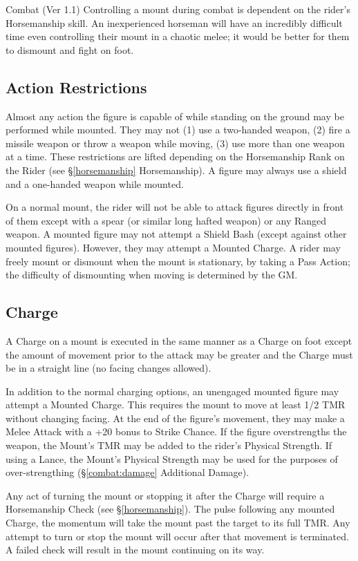 \begin{Chapter}{Combat (Ver 1.1)}
Controlling a mount during combat is dependent on the rider’s
Horsemanship skill.  An inexperienced horseman will have an
incredibly difficult time even controlling their mount in a chaotic
melee; it would be better for them to dismount and fight on foot.

\subsection{Action Restrictions}

Almost any action the figure is capable of while standing on the
ground may be performed while mounted.  They may not (1) use a
two-handed weapon, (2) fire a missile weapon or throw a weapon while
moving, (3) use more than one weapon at a time.  These restrictions
are lifted depending on the Horsemanship Rank on the Rider (see
\S\ref{horsemanship} Horsemanship).  A figure may always use a shield
and a one-handed weapon while mounted.

On a normal mount, the rider will not be able to attack figures
directly in front of them except with a spear (or similar long hafted
weapon) or any Ranged weapon.  A mounted figure may not attempt a
Shield Bash (except against other mounted figures).  However, they may
attempt a Mounted Charge.  A rider may freely mount or dismount when
the mount is stationary, by taking a Pass Action; the difficulty of
dismounting when moving is determined by the GM.

\subsection{Charge}

A Charge on a mount is executed in the same manner as a Charge on foot
except the amount of movement prior to the attack may be greater and
the Charge must be in a straight line (no facing changes allowed).

In addition to the normal charging options, an unengaged mounted
figure may attempt a Mounted Charge.  This requires the mount to move
at least 1/2 TMR without changing facing.  At the end of the figure’s
movement, they may make a Melee Attack with a +20 bonus to Strike
Chance.  If the figure overstrengths the weapon, the Mount’s TMR may
be added to the rider’s Physical Strength.  If using a Lance, the
Mount’s Physical Strength may be used for the purposes of
over-strengthing (\S\ref{combat:damage} Additional Damage).

Any act of turning the mount or stopping it after the Charge will
require a Horsemanship Check (see \S\ref{horsemanship}).  The pulse
following any mounted Charge, the momentum will take the mount past
the target to its full TMR.  Any attempt to turn or stop the mount
will occur after that movement is terminated.  A failed check will
result in the mount continuing on its way.


\end{Chapter}
